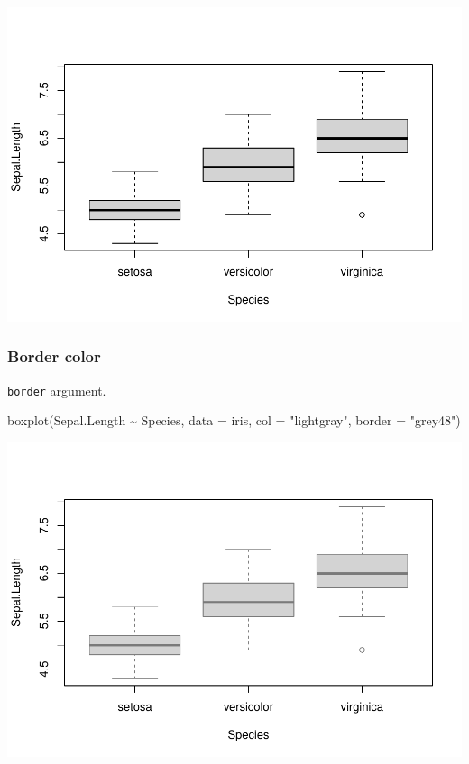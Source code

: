 \documentclass[
]{article}
\newenvironment{Shaded}{\begin{snugshade}}{\end{snugshade}}
\newcommand{\AttributeTok}[1]{\textcolor[rgb]{0.77,0.63,0.00}{#1}}
\newcommand{\FunctionTok}[1]{\textcolor[rgb]{0.00,0.00,0.00}{#1}}
\newcommand{\NormalTok}[1]{#1}
\newcommand{\SpecialCharTok}[1]{\textcolor[rgb]{0.00,0.00,0.00}{#1}}
\newcommand{\StringTok}[1]{\textcolor[rgb]{0.31,0.60,0.02}{#1}}
\begin{document}
\begin{center}\includegraphics{biostats_files/figure-latex/unnamed-chunk-131-1} \end{center}

\hypertarget{border-color}{%
\subsubsection{Border color}\label{border-color}}

\texttt{border} argument.

\begin{Shaded}
\begin{Highlighting}[]
\FunctionTok{boxplot}\NormalTok{(Sepal.Length }\SpecialCharTok{\textasciitilde{}}\NormalTok{ Species, }\AttributeTok{data =}\NormalTok{ iris,}
        \AttributeTok{col =} \StringTok{"lightgray"}\NormalTok{, }\AttributeTok{border =} \StringTok{"grey48"}\NormalTok{)}
\end{Highlighting}
\end{Shaded}

\begin{center}\includegraphics{biostats_files/figure-latex/unnamed-chunk-132-1} \end{center}
\end{document}
